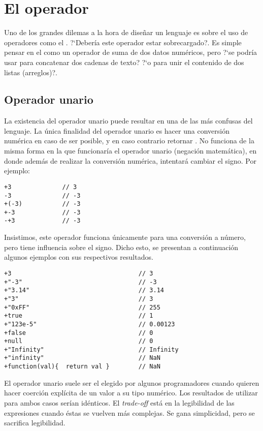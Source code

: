 \section{El operador \code{+}}
\label{sec:operadormas}

Uno de los grandes dilemas a la hora de diseñar un lenguaje es sobre el uso de operadores como el \code{+}. ?`Debería este operador estar sobrecargado?. Es simple pensar en el \code{+} como un operador de suma de dos datos numéricos, pero ?`se podría usar para concatenar dos cadenas de texto? ?`o para unir el contenido de dos listas (arreglos)?.

\subsection{Operador unario}

La existencia del operador unario \code{+} puede resultar en una de las más confusas del lenguaje. La única finalidad del operador unario \code{+} es hacer una conversión numérica en caso de ser posible, y en caso contrario retornar . No funciona de la misma forma en la que funcionaría el operador unario \code{-} (negación matemática), en donde además de realizar la conversión numérica, intentará cambiar el signo. Por ejemplo:

\begin{lstlisting}[title={Operador unario \code{+}}]
+3				// 3
-3				// -3
+(-3)			// -3
+-3				// -3
-+3				// -3
\end{lstlisting}

Insistimos, este operador funciona únicamente para una conversión a número, pero tiene influencia sobre el signo. Dicho esto, se presentan a continuación algunos ejemplos con sus respectivos resultados.

\begin{lstlisting}[title={Operador unario \code{+} (más casos)}]
+3                                   // 3
+"-3"                                // -3
+"3.14"                              // 3.14
+"3"                                 // 3
+"0xFF"                              // 255
+true                                // 1
+"123e-5"                            // 0.00123
+false                               // 0
+null                                // 0
+"Infinity"                          // Infinity
+"infinity"                          // NaN
+function(val){  return val }        // NaN
\end{lstlisting}

El operador unario \code{+} suele ser el elegido por algunos programadores cuando quieren hacer coerción explícita de un valor a su tipo numérico. Los resultados de utilizar  para ambos casos serían idénticos. El \textit{trade-off} está en la legibilidad de las expresiones cuando éstas se vuelven más complejas. Se gana simplicidad, pero se sacrifica legibilidad.

